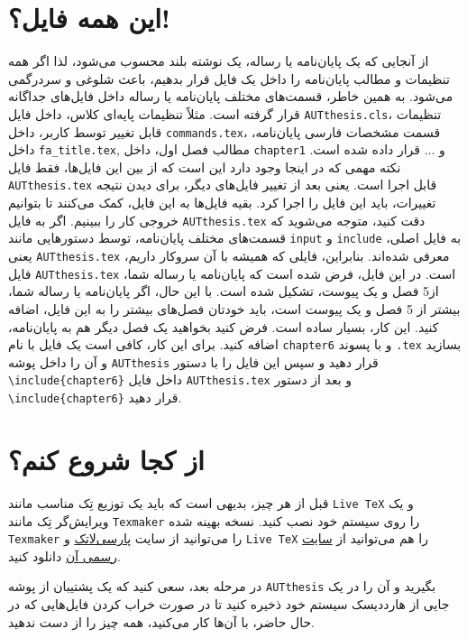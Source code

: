 \section{این همه فایل؟!}\label{sec2}
از آنجایی که یک پایان‌نامه یا رساله، یک نوشته بلند محسوب می‌شود، لذا اگر همه تنظیمات و مطالب پایان‌نامه را داخل یک فایل قرار بدهیم، باعث شلوغی
و سردرگمی می‌شود. به همین خاطر، قسمت‌های مختلف پایان‌نامه یا رساله  داخل فایل‌های جداگانه قرار گرفته است. مثلاً تنظیمات پایه‌ای کلاس، داخل فایل
\verb;AUTthesis.cls;، 
تنظیمات قابل تغییر توسط کاربر، داخل 
\verb;commands.tex;،
قسمت مشخصات فارسی پایان‌نامه، داخل 
\verb;fa_title.tex;,
مطالب فصل اول، داخل 
\verb;chapter1;
و ... قرار داده شده است. نکته مهمی که در اینجا وجود دارد این است که از بین این  فایل‌ها، فقط فایل 
\verb;AUTthesis.tex;
قابل اجرا است. یعنی بعد از تغییر فایل‌های دیگر، برای دیدن نتیجه تغییرات، باید این فایل را اجرا کرد. بقیه فایل‌ها به این فایل، کمک می‌کنند تا بتوانیم خروجی کار را ببینیم. اگر به فایل 
\verb;AUTthesis.tex;
دقت کنید، متوجه می‌شوید که قسمت‌های مختلف پایان‌نامه، توسط دستورهایی مانند 
\verb;input;
و
\verb;include;
به فایل اصلی، یعنی 
\verb;AUTthesis.tex;
معرفی شده‌اند. بنابراین، فایلی که همیشه با آن سروکار داریم، فایل 
\verb;AUTthesis.tex;
است.
در این فایل، فرض شده است که پایان‌نامه یا رساله شما، از5 فصل و یک پیوست، تشکیل شده است. با این حال، اگر
  پایان‌نامه یا رساله شما، بیشتر از 5 فصل و یک پیوست است، باید خودتان فصل‌های بیشتر را به این فایل، اضافه کنید. این کار، بسیار ساده است. فرض کنید بخواهید یک فصل دیگر هم به پایان‌نامه، اضافه کنید. برای این کار، کافی است یک فایل با نام 
\verb;chapter6;
و با پسوند 
\verb;.tex;
بسازید و آن را داخل پوشه 
\verb;AUTthesis;
قرار دهید و سپس این فایل را با دستور 
\texttt{\textbackslash include\{chapter6\}}
داخل فایل
\verb;AUTthesis.tex;
و بعد از دستور
\texttt{\textbackslash include\{chapter6\}}
 قرار دهید.

\section{از کجا شروع کنم؟}
قبل از هر چیز، بدیهی است که باید یک توزیع تِک مناسب مانند 
\verb;Live TeX;
و یک ویرایش‌گر تِک مانند
\verb;Texmaker;
را روی سیستم خود نصب کنید.  نسخه بهینه شده 
\verb;Texmaker;
را می‌توانید  از سایت 
 \href{http://www.parsilatex.com}{پارسی‌لاتک}%
 و
\verb;Live TeX;
را هم می‌توانید از 
 \href{http://www.tug.org/texlive}{سایت رسمی آن}
 دانلود کنید.
 
در مرحله بعد، سعی کنید که  یک پشتیبان از پوشه 
\verb;AUTthesis;
 بگیرید و آن را در یک جایی از هارددیسک سیستم خود ذخیره کنید تا در صورت خراب کردن فایل‌هایی که در حال حاضر، با آن‌ها کار می‌کنید، همه چیز را از 
 دست ندهید.
 
